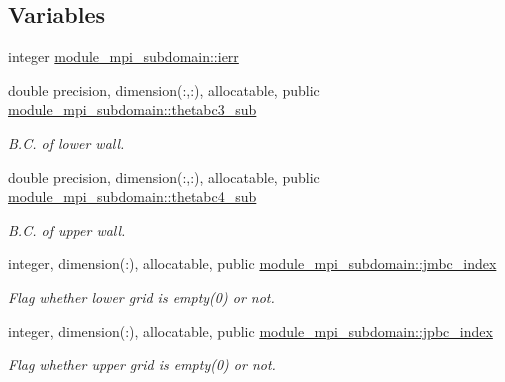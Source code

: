 \subsection*{Variables}
\begin{DoxyCompactItemize}
\item 
integer \mbox{\hyperlink{namespacemodule__mpi__subdomain_a180679cc4b2a39351cff87dcca079484}{module\+\_\+mpi\+\_\+subdomain\+::ierr}}
\item 
double precision, dimension(\+:,\+:), allocatable, public \mbox{\hyperlink{namespacemodule__mpi__subdomain_a64208c4f25ace4acb038e217cc784f02}{module\+\_\+mpi\+\_\+subdomain\+::thetabc3\+\_\+sub}}
\begin{DoxyCompactList}\small\item\em B.\+C. of lower wall. \end{DoxyCompactList}\item 
double precision, dimension(\+:,\+:), allocatable, public \mbox{\hyperlink{namespacemodule__mpi__subdomain_a63ecab89051a64282880083d20844204}{module\+\_\+mpi\+\_\+subdomain\+::thetabc4\+\_\+sub}}
\begin{DoxyCompactList}\small\item\em B.\+C. of upper wall. \end{DoxyCompactList}\item 
integer, dimension(\+:), allocatable, public \mbox{\hyperlink{namespacemodule__mpi__subdomain_a1c2c2f77c74c40af73c7f65e3cba756e}{module\+\_\+mpi\+\_\+subdomain\+::jmbc\+\_\+index}}
\begin{DoxyCompactList}\small\item\em Flag whether lower grid is empty(0) or not. \end{DoxyCompactList}\item 
integer, dimension(\+:), allocatable, public \mbox{\hyperlink{namespacemodule__mpi__subdomain_a9cf8549a75cc5cc0cd1541b2567c7dfd}{module\+\_\+mpi\+\_\+subdomain\+::jpbc\+\_\+index}}
\begin{DoxyCompactList}\small\item\em Flag whether upper grid is empty(0) or not. \end{DoxyCompactList}\end{DoxyCompactItemize}
\textbf{ }\par
